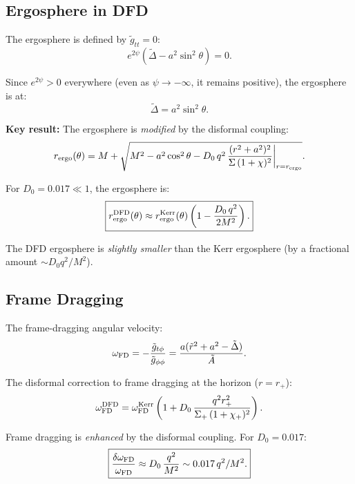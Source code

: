 \documentclass[11pt,a4paper]{article}
\begin{document}
\subsection{Ergosphere in DFD}

The ergosphere is defined by $\tilde{g}_{tt} = 0$:
\begin{equation}
e^{2\psi}\left(\tilde\Delta - a^2\sin^2\theta\right) = 0.
\end{equation}

Since $e^{2\psi} > 0$ everywhere (even as $\psi \to -\infty$, it remains positive), the ergosphere is at:
\begin{equation}
\tilde\Delta = a^2\sin^2\theta.
\end{equation}

\textbf{Key result:} The ergosphere is \emph{modified} by the disformal coupling:
\begin{equation}
r_{\rm ergo}(\theta) = M + \sqrt{M^2 - a^2\cos^2\theta - D_0\,q^2\,\frac{(r^2+a^2)^2}{\Sigma\,(1+\chi)^2}\bigg|_{r=r_{\rm ergo}}}.
\end{equation}

For $D_0 = 0.017 \ll 1$, the ergosphere is:
\begin{equation}
\boxed{r_{\rm ergo}^{\rm DFD}(\theta) \approx r_{\rm ergo}^{\rm Kerr}(\theta)\left(1 - \frac{D_0\,q^2}{2M^2}\right).}
\end{equation}

The DFD ergosphere is \emph{slightly smaller} than the Kerr ergosphere (by a fractional amount $\sim D_0 q^2/M^2$).

\subsection{Frame Dragging}

The frame-dragging angular velocity:
\begin{equation}
\omega_{\rm FD} = -\frac{\tilde{g}_{t\phi}}{\tilde{g}_{\phi\phi}} = \frac{a(\tilde r^2 + a^2 - \tilde\Delta)}{\tilde A}.
\end{equation}

The disformal correction to frame dragging at the horizon ($r = r_+$):
\begin{equation}
\omega_{\rm FD}^{\rm DFD} = \omega_{\rm FD}^{\rm Kerr}\left(1 + D_0\,\frac{q^2 r_+^2}{\Sigma_+\,(1+\chi_+)^2}\right).
\end{equation}

Frame dragging is \emph{enhanced} by the disformal coupling. For $D_0 = 0.017$:
\begin{equation}
\boxed{\frac{\delta\omega_{\rm FD}}{\omega_{\rm FD}} \approx D_0\,\frac{q^2}{M^2} \sim 0.017\,q^2/M^2.}
\end{equation}
\end{document}
